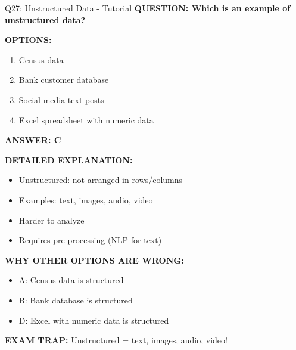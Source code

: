 \documentclass[8pt]{beamer}
\begin{document}
	\begin{frame}{Q27: Unstructured Data - Tutorial}
		\fontsize{6.5}{7.5}\selectfont
		\textbf{QUESTION: Which is an example of unstructured data?}
		
		\vspace{0.1cm}
		\textbf{OPTIONS:}
		\begin{enumerate}
			\item Census data
			\item Bank customer database
			\item Social media text posts
			\item Excel spreadsheet with numeric data
		\end{enumerate}
		
		\vspace{0.1cm}
		\textcolor{myblue}{\textbf{ANSWER: C}}
		
		\vspace{0.1cm}
		\textbf{DETAILED EXPLANATION:}
		\begin{itemize}
			\item Unstructured: not arranged in rows/columns
			\item Examples: text, images, audio, video
			\item Harder to analyze
			\item Requires pre-processing (NLP for text)
		\end{itemize}
		
		\vspace{0.1cm}
		\textcolor{myred}{\textbf{WHY OTHER OPTIONS ARE WRONG:}}
		\begin{itemize}
			\item \textcolor{myred}{A:} Census data is structured
			\item \textcolor{myred}{B:} Bank database is structured
			\item \textcolor{myred}{D:} Excel with numeric data is structured
		\end{itemize}
		
		\textcolor{myred}{\textbf{EXAM TRAP:}} Unstructured = \textcolor{myblue}{text, images, audio, video}!
	\end{frame}
	
\end{document}
